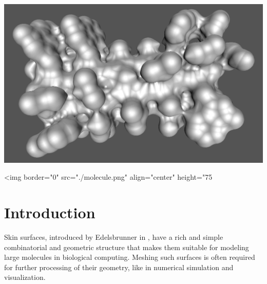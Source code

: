 
\newcommand{\dabs}[1]{{\parallel\! #1 \!\parallel}}

\label{chapter_SkinSurface}

\minitoc

\begin{ccTexOnly}
\begin{center}
\includegraphics[width=.9\textwidth]{Skin_surface_3/molecule}
\end{center}
\end{ccTexOnly}
\begin{ccHtmlOnly}
<img border="0" src="./molecule.png" align="center" height="75%
\end{ccHtmlOnly}

\section{Introduction}
\label{sectionSkinSurfaceIntro}

Skin surfaces, introduced by Edelsbrunner in \cite{cgal:e-dssd-99},
have a rich and simple combinatorial and geometric structure that
makes them suitable for modeling large molecules in biological
computing.  Meshing such surfaces is often required for further
processing of their geometry, like in numerical simulation and
visualization.

